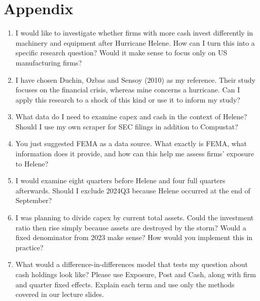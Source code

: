 \begingroup
\renewcommand{\thepage}{B-\arabic{page}}
\setcounter{page}{1}
\normalfont
\onehalfspacing
\raggedbottom
\setlength{\parindent}{0pt}
\setlength{\parskip}{0.25\baselineskip}

\section*{Appendix}

\begin{enumerate}
\setlength{\itemsep}{0.5\baselineskip}
\setlength{\parsep}{0pt}

\item I would like to investigate whether firms with more cash invest differently
in machinery and equipment after Hurricane Helene. How can I turn this into a
specific research question? Would it make sense to focus only on US manufacturing
firms?

\item I have chosen Duchin, Ozbas and Sensoy (2010) as my reference. Their study
focuses on the financial crisis, whereas mine concerns a hurricane. Can I apply
this research to a shock of this kind or use it to inform my study?

\item What data do I need to examine capex and cash in the context of Helene?
Should I use my own scraper for SEC filings in addition to Compustat?

\item You just suggested FEMA as a data source. What exactly is FEMA, what
information does it provide, and how can this help me assess firms' exposure
to Helene?

\item I would examine eight quarters before Helene and four full quarters
afterwards. Should I exclude 2024Q3 because Helene occurred at the end of
September?

\item I was planning to divide capex by current total assets. Could the
investment ratio then rise simply because assets are destroyed by the storm?
Would a fixed denominator from 2023 make sense? How would you implement this
in practice?

\item What would a difference-in-differences model that tests my question about
cash holdings look like? Please use Exposure, Post and Cash, along with firm
and quarter fixed effects. Explain each term and use only the methods covered
in our lecture slides.


\end{enumerate}

